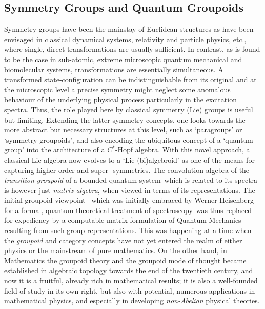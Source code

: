 \documentclass[12pt]{article}
\theoremstyle{plain}
\theoremstyle{definition}
\numberwithin{equation}{section}
\begin{document}
\subsection{Symmetry Groups and Quantum Groupoids}

Symmetry groups have been the mainstay of Euclidean structures as have been envisaged in classical dynamical systems, relativity and particle physics, etc., where single, direct transformations are usually sufficient. In contrast, as is found to be the case in sub-atomic, extreme microscopic quantum mechanical and biomolecular systems, transformations are essentially simultaneous. A transformed state-configuration can be indistinguishable from its original and at the microscopic level a precise symmetry might neglect some anomalous behaviour of the underlying physical process particularly in the excitation spectra. Thus, the role played here by classical symmetry (Lie) groups is useful but limiting.  Extending the latter symmetry concepts, one looks towards the more abstract but necessary structures at this level, such as `paragroups' or `symmetry groupoids', and also encoding the ubiquitous concept of a `quantum group' into the architecture of a $C^*$-Hopf algebra. With this novel approach, a classical Lie algebra now evolves to a `Lie (bi)algebroid' as one of the means for capturing higher order and super- symmetries.  The convolution algebra of the {\em transition groupoid} of a bounded quantum system--which is related to its spectra--is however just {\em matrix algebra}, when viewed in terms of its representations.  The initial groupoid viewpoint-- which was initially embraced by Werner Heisenberg for a formal, quantum-theoretical treatment of spectroscopy--was thus replaced for expediency by a computable matrix formulation of Quantum Mechanics resulting from such group representations. This was happening at a time when the {\em groupoid} and category concepts have not yet entered the realm of either physics or the mainstream of pure mathematics. On the other hand, in Mathematics the groupoid theory and the groupoid mode of thought became established in algebraic topology \cite{RB1} towards the end of the twentieth century, and now  it is a fruitful, already rich in mathematical results; it is also a well-founded field of study in its own right, but also with potential, numerous applications in mathematical physics, and especially in developing {\em non-Abelian} physical theories. 
\end{document}
